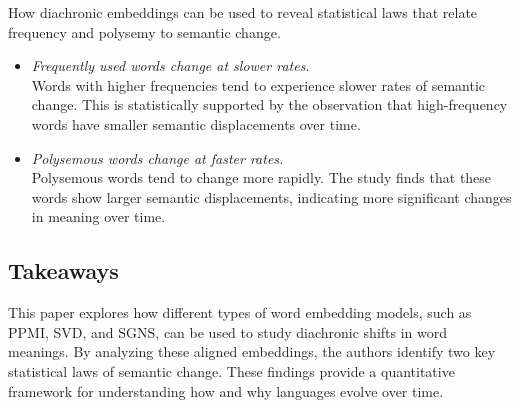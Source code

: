 How diachronic embeddings can be used to reveal statistical laws that relate frequency and polysemy to semantic change.

\begin{itemize}
    \item {} \emph{Frequently used words change at slower rates.}\\
    Words with higher frequencies tend to experience slower rates of semantic change.
    This is statistically supported by the observation that high-frequency words have smaller semantic displacements over time.
    \item {} \emph{Polysemous words change at faster rates.}\\
    Polysemous words tend to change more rapidly.
    The study finds that these words show larger semantic displacements, indicating more significant changes in meaning over time.
\end{itemize}

\subsection{Takeaways}\label{subsec:takeaways4}
This paper explores how different types of word embedding models, such as PPMI, SVD, and SGNS, can be used to study diachronic shifts in word meanings.
By analyzing these aligned embeddings, the authors identify two key statistical laws of semantic change.
These findings provide a quantitative framework for understanding how and why languages evolve over time.


